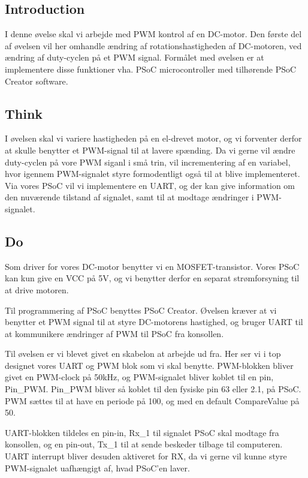 \documentclass[../main.tex]{subfiles}
\begin{document}
\subsection{Introduction}
I denne øvelse skal vi arbejde med PWM kontrol af en DC-motor. Den første del af øvelsen vil her omhandle ændring af rotationshastigheden af DC-motoren, ved ændring af duty-cyclen på et PWM signal. 
Formålet med øvelsen er at implementere disse funktioner vha. PSoC microcontroller med tilhørende PSoC Creator software. 

\subsection{Think}
I øvelsen skal vi variere hastigheden på en el-drevet motor, og vi forventer derfor at skulle benytter et PWM-signal til at lavere spænding. Da vi gerne vil ændre duty-cyclen på vore PWM siganl i små trin, vil incrementering af en variabel, hvor igennem PWM-signalet styre formodentligt også til at blive implementeret. Via vores PSoC vil vi implementere en UART, og der kan give information om den nuværende tilstand af signalet, samt til at modtage ændringer i PWM-signalet.

\subsection{Do}
Som driver for vores DC-motor benytter vi en MOSFET-transistor. Vores PSoC kan kun give en VCC på 5V, og vi benytter derfor en separat strømforsyning til at drive motoren.


Til programmering af PSoC benyttes PSoC Creator. Øvelsen kræver at vi benytter et PWM signal til at styre DC-motorens hastighed, og bruger UART til at kommunikere ændringer af PWM til PSoC fra konsollen.

Til øvelsen er vi blevet givet en skabelon at arbejde ud fra. Her ser vi i top designet vores UART og PWM blok som vi skal benytte. PWM-blokken bliver givet en PWM-clock på 50kHz, og PWM-signalet bliver koblet til en pin, Pin\_PWM. Pin\_PWM bliver så koblet til den fysiske pin 63 eller 2.1, på PSoC. PWM sættes til at have en periode på 100, og med en default CompareValue på 50.


UART-blokken tildeles en pin-in, Rx\_1 til signalet PSoC skal modtage fra konsollen, og en pin-out, Tx\_1 til at sende beskeder tilbage til computeren. UART interrupt bliver desuden aktiveret for RX, da vi gerne vil kunne styre PWM-signalet uafhængigt af, hvad PSoC'en laver.
\end{document}
